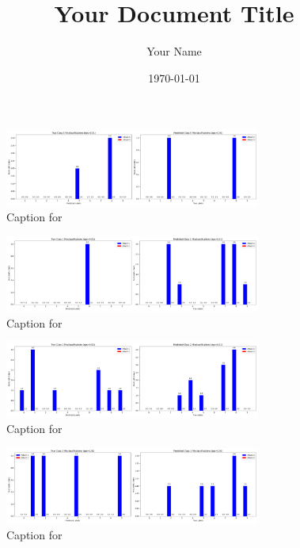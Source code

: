 \documentclass{article}
\begin{document}
\title{Your Document Title}
\author{Your Name}
\date{\today}
\maketitle



\begin{figure}[!htbp]
\centering
\includegraphics[width=0.75\textwidth]{combined_class_boundary_pgd/combined_class_0_misclassifications_eps_0.01.png}
\caption{Caption for }
\label{fig:combined_class_0_misclassifications_eps_0.01.png}
\end{figure}

\begin{figure}[!htbp]
\centering
\includegraphics[width=0.75\textwidth]{combined_class_boundary_pgd/combined_class_1_misclassifications_eps_0.01.png}
\caption{Caption for }
\label{fig:combined_class_1_misclassifications_eps_0.01.png}
\end{figure}

\begin{figure}[!htbp]
\centering
\includegraphics[width=0.75\textwidth]{combined_class_boundary_pgd/combined_class_2_misclassifications_eps_0.01.png}
\caption{Caption for }
\label{fig:combined_class_2_misclassifications_eps_0.01.png}
\end{figure}

\begin{figure}[!htbp]
\centering
\includegraphics[width=0.75\textwidth]{combined_class_boundary_pgd/combined_class_3_misclassifications_eps_0.01.png}
\caption{Caption for }
\label{fig:combined_class_3_misclassifications_eps_0.01.png}
\end{figure}
\end{document}
